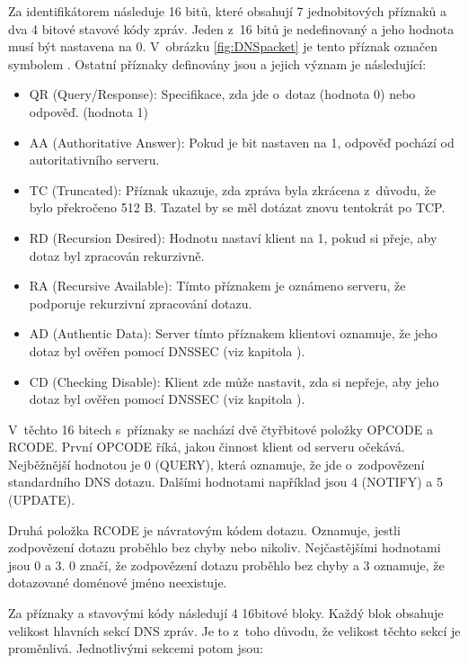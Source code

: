 \documentclass[thesis=M,czech]{src/FITthesis}[2019/12/23]
\begin{document}
Za identifikátorem následuje 16 bitů, které obsahují 7 jednobitových \linebreak příznaků a dva 4 bitové stavové kódy zpráv. Jeden z~16 bitů je nedefinovaný a jeho hodnota musí být nastavena na 0. V~obrázku \ref{fig:DNSpacket} je tento příznak označen symbolem \uv{-}. Ostatní příznaky definovány jsou a jejich význam je následující: 
\begin{itemize}
	\item QR (Query/Response): Specifikace, zda jde o~dotaz (hodnota 0) nebo odpověď. (hodnota 1)
	\item AA (Authoritative Answer): Pokud je bit nastaven na 1, odpověď pochází od autoritativního serveru.
	\item TC (Truncated): Příznak ukazuje, zda zpráva byla zkrácena z~důvodu, že bylo překročeno 512 B. Tazatel by se měl dotázat znovu tentokrát po TCP.
	\item RD (Recursion Desired): Hodnotu nastaví klient na 1, pokud si přeje, aby dotaz byl zpracován rekurzivně. 
	\item RA (Recursive Available): Tímto příznakem je oznámeno serveru, že podporuje rekurzivní zpracování dotazu. 
	\item AD (Authentic Data): Server tímto příznakem klientovi oznamuje, že jeho dotaz byl ověřen pomocí DNSSEC (viz kapitola ). 
	\item CD (Checking Disable): Klient zde může nastavit, zda si nepřeje, aby jeho dotaz byl ověřen pomocí DNSSEC (viz kapitola ).
\end{itemize}

V~těchto 16 bitech s~příznaky se nachází dvě čtyřbitové položky OPCODE a RCODE. První OPCODE říká, jakou činnost klient od serveru očekává.  Nejběžnější hodnotou je 0 (QUERY), která oznamuje, že jde o~zodpovězení standardního DNS dotazu. Dalšími hodnotami například jsou 4 (NOTIFY) a 5 (UPDATE). \cite{RFC1035, RFC2136, RFC4034, root-dnssec-about}

Druhá položka RCODE je návratovým kódem dotazu. Oznamuje, jestli zodpovězení dotazu proběhlo bez chyby nebo nikoliv. Nejčastějšími hodnotami jsou 0 a 3. 0 značí, že zodpovězení dotazu proběhlo bez chyby a 3 oznamuje, že dotazované doménové jméno neexistuje. \cite{RFC1035}

Za příznaky a stavovými kódy následují 4 16bitové bloky. Každý blok obsahuje velikost hlavních sekcí DNS zpráv. Je to z~toho důvodu, že velikost těchto sekcí je proměnlivá. Jednotlivými sekcemi potom jsou: 
\end{document}
